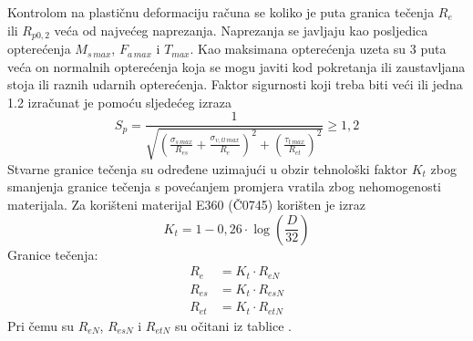 \documentclass[11pt,a4paper]{report}
\begin{document}
Kontrolom na plastičnu deformaciju računa se koliko je puta granica tečenja $R_e$ ili $R_{p0,2}$ veća od najvećeg naprezanja.
Naprezanja se javljaju kao posljedica opterećenja $M_{s \, max}$, $F_{a \, max}$ i $T_{max}$.
Kao maksimana opterećenja uzeta su 3 puta veća on normalnih opterećenja koja se mogu javiti kod pokretanja ili zaustavljana stoja ili raznih udarnih opterećenja.
Faktor sigurnosti koji treba biti veći ili jedna 1.2 izračunat je pomoću sljedećeg izraza
\begin{equation}
S_p=\frac{1}{\sqrt{\left( \frac{\sigma_{s \, max}}{R_{es}}+\frac{\sigma_{v,tl \, max}}{R_e}\right)^2+ \left( \frac{\tau_{t \, max}}{R_{et}}\right)^2}}\geq 1,2 \label{equ_faktorSigurnostiPlasticeDeformacije}
\end{equation}
Stvarne granice tečenja su određene uzimajući u obzir tehnološki faktor $K_t$ zbog smanjenja granice tečenja s povećanjem promjera vratila zbog nehomogenosti materijala. Za korišteni materijal E360 (Č0745) korišten je izraz
\begin{equation}
K_t=1-0,26\cdot \log \left( \frac{D}{32} \right) \label{equ:faktorKt}
\end{equation}
Granice tečenja:
\begin{align}
R_e &= K_t \cdot R_{eN} \label{equ:Re} \\
R_{es} &= K_t \cdot R_{esN} \label{equ:Res} \\
R_{et} &= K_t \cdot R_{etN} \label{equ:Ret}
\end{align}
Pri čemu su $R_{eN}$, $R_{esN}$ i $R_{etN}$ su očitani iz tablice \cite{potrebniMaterijali}.
\end{document}
